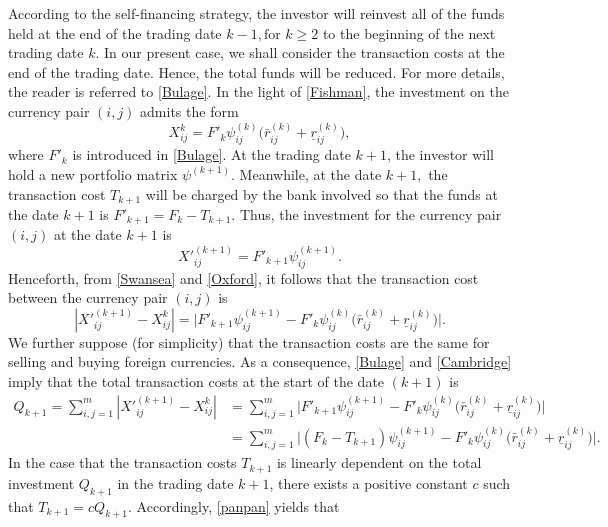 \documentclass[11pt]{article}
\numberwithin{equation}{section}
\begin{document}
According to the self-financing strategy,  the investor will reinvest all of the funds held at the end of the trading date $k-1, \mbox{for }  k\geq 2$ to the beginning of the next trading date $k$. In our 
present case, we shall consider the transaction costs at the end of the trading date. Hence, the total funds will be reduced.  For more details, the reader is referred to \eqref{Bulage}.   In the light of \eqref{Fishman}, the investment on the currency pair $(i,j) $  admits the form 
\begin{equation}\label{Swansea}
X^{k}_{ij}=F'_k \psi^{(k)}_{ij}\Big(\bar r^{(k)}_{ij}+\underline r^{(k)}_{ij}\Big),\end{equation}
where $F'_k$ is introduced in \eqref{Bulage}. At the trading date $k+1$,   the investor will hold a new portfolio matrix $\psi^{(k+1)}$. Meanwhile, at the date $k+1,$ the transaction cost  $T_{k+1}$ will 
be charged by the bank involved so that the funds at the date $k+1$ is $F'_{k+1}=F_k-T_{k+1}$. Thus,  the  investment for the currency pair $(i,j)$ at the date $k+1$ is
\begin{equation}\label{Oxford}
X'^{(k+1)}_{ij}=F'_{k+1}\psi^{(k+1)}_{ij}.\end{equation}
Henceforth,  from \eqref{Swansea} and \eqref{Oxford}, it follows that  the transaction cost between the currency pair   $(i,j)$  is
\begin{equation}\label{Cambridge}|X'^{(k+1)}_{ij} -X^{k}_{ij}|=\Big|F'_{k+1}\psi^{(k+1)}_{ij}-F'_k \psi^{(k)}_{ij}\Big(\bar r^{(k)}_{ij}+\underline r^{(k)}_{ij}\Big)\Big|.\end{equation}
We further suppose (for simplicity) that the transaction costs are the same for selling and buying foreign currencies. As a consequence, \eqref{Bulage} and  \eqref{Cambridge} imply that  the total 
transaction costs at the start of the date $(k+1)$ is  
\begin{equation}\label{panpan}
\begin{split}
Q_{k+1}=\sum_{i,j=1}^{m} |X'^{(k+1)}_{ij} -X^{k}_{ij}|
&=\sum_{i,j=1}^{m}\Big |F'_{k+1}\psi^{(k+1)}_{ij}-F'_k \psi^{(k)}_{ij}\Big(\bar r^{(k)}_{ij}+\underline r^{(k)}_{ij}\Big)\Big|\\
&=\sum_{i,j=1}^{m}\Big |(F_k-T_{k+1})\psi^{(k+1)}_{ij}-F'_k \psi^{(k)}_{ij}\Big(\bar r^{(k)}_{ij}+\underline r^{(k)}_{ij}\Big)\Big|.
\end{split}
\end{equation}
In the case that the transaction costs $T_{k+1}$ is linearly dependent  on the total investment $Q_{k+1}$ in the trading date $k+1$, there exists a positive constant $c$ such that $T_{k+1}=cQ_{k+1}$.  Accordingly, \eqref{panpan} yields that 
\end{document}
